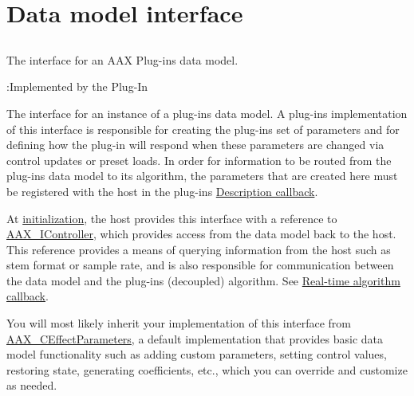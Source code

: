 \hypertarget{a00328}{}\section{Data model interface}
\label{a00328}


\subsection{ }
The interface for an A\+A\+X Plug-\/in\textquotesingle{}s data model. 

\begin{DoxyRefDesc}{\+:\+Implemented by the Plug-\/\+In}
\item[\hyperlink{a00004__aax_plugin_implementation000003}{\+:\+Implemented by the Plug-\/\+In}]\end{DoxyRefDesc}


The interface for an instance of a plug-\/in\textquotesingle{}s data model. A plug-\/in\textquotesingle{}s implementation of this interface is responsible for creating the plug-\/in\textquotesingle{}s set of parameters and for defining how the plug-\/in will respond when these parameters are changed via control updates or preset loads. In order for information to be routed from the plug-\/in\textquotesingle{}s data model to its algorithm, the parameters that are created here must be registered with the host in the plug-\/in\textquotesingle{}s \hyperlink{a00326}{Description callback}.

At \hyperlink{a00061_ad4db3c0ab67f8f41cdd042a915daabb4}{initialization}, the host provides this interface with a reference to \hyperlink{a00090}{A\+A\+X\+\_\+\+I\+Controller}, which provides access from the data model back to the host. This reference provides a means of querying information from the host such as stem format or sample rate, and is also responsible for communication between the data model and the plug-\/in\textquotesingle{}s (decoupled) algorithm. See \hyperlink{a00327}{Real-\/time algorithm callback}.

You will most likely inherit your implementation of this interface from \hyperlink{a00018}{A\+A\+X\+\_\+\+C\+Effect\+Parameters}, a default implementation that provides basic data model functionality such as adding custom parameters, setting control values, restoring state, generating coefficients, etc., which you can override and customize as needed.

